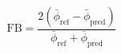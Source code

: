 \documentclass[11pt]{article}
\begin{document}
\begin{equation*}
\text{FB} = \frac{2(\bar{\phi}_{\text{ref}} - \bar{\phi}_{\text{pred}})}{\bar{\phi}_{\text{ref}} + \bar{\phi}_{\text{pred}}}\tag{14}
\end{equation*}
\end{document}
